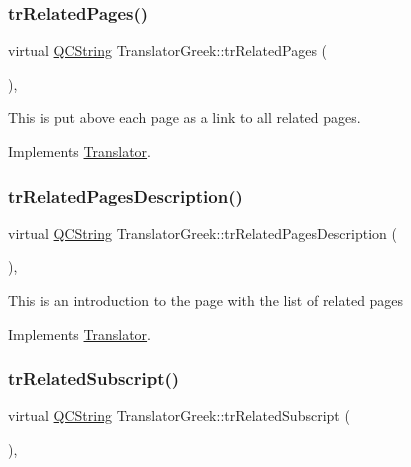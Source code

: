 \subsubsection{\texorpdfstring{trRelatedPages()}{trRelatedPages()}}
{\footnotesize\ttfamily virtual \mbox{\hyperlink{class_q_c_string}{Q\+C\+String}} Translator\+Greek\+::tr\+Related\+Pages (\begin{DoxyParamCaption}{ }\end{DoxyParamCaption})\hspace{0.3cm}{\ttfamily [inline]}, {\ttfamily [virtual]}}

This is put above each page as a link to all related pages. 

Implements \mbox{\hyperlink{class_translator}{Translator}}.

\mbox{\label{class_translator_greek_a01064bad2a5ebc39a3efb3de5d92eba3}} 
\subsubsection{\texorpdfstring{trRelatedPagesDescription()}{trRelatedPagesDescription()}}
{\footnotesize\ttfamily virtual \mbox{\hyperlink{class_q_c_string}{Q\+C\+String}} Translator\+Greek\+::tr\+Related\+Pages\+Description (\begin{DoxyParamCaption}{ }\end{DoxyParamCaption})\hspace{0.3cm}{\ttfamily [inline]}, {\ttfamily [virtual]}}

This is an introduction to the page with the list of related pages 

Implements \mbox{\hyperlink{class_translator}{Translator}}.

\mbox{\label{class_translator_greek_a6bf6b5e060f9899d7867f39953bd1669}} 
\subsubsection{\texorpdfstring{trRelatedSubscript()}{trRelatedSubscript()}}
{\footnotesize\ttfamily virtual \mbox{\hyperlink{class_q_c_string}{Q\+C\+String}} Translator\+Greek\+::tr\+Related\+Subscript (\begin{DoxyParamCaption}{ }\end{DoxyParamCaption})\hspace{0.3cm}{\ttfamily [inline]}, {\ttfamily [virtual]}}

